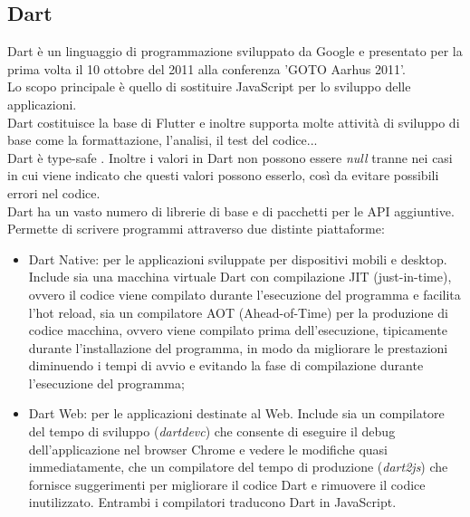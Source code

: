 \subsection{Dart}
\label{sec:Dart}
Dart \cite{dart,dartstoria} è un linguaggio di programmazione sviluppato da Google e presentato per la prima volta il 10 ottobre del 2011 alla conferenza 'GOTO Aarhus 2011'.\\
Lo scopo principale è quello di sostituire JavaScript per lo sviluppo delle applicazioni.\\
Dart costituisce la base di Flutter e inoltre supporta molte attività di sviluppo di base come la formattazione, l'analisi, il test del codice...\\
Dart è type-safe \cite{dartover}. Inoltre i valori in Dart non possono essere \textit{null} tranne nei casi in cui viene indicato che questi valori possono esserlo, così da evitare possibili errori nel codice.\\
Dart ha un vasto numero di librerie di base e di pacchetti per le API aggiuntive.\\
Permette di scrivere programmi attraverso due distinte piattaforme: 
\begin{itemize}
	\item Dart Native: per le applicazioni sviluppate per dispositivi mobili e desktop. Include sia una macchina virtuale Dart con compilazione JIT (just-in-time), ovvero il codice viene compilato durante l'esecuzione del programma e facilita l'hot reload, sia un compilatore AOT (Ahead-of-Time) per la produzione di codice macchina, ovvero  viene compilato prima dell'esecuzione, tipicamente durante l'installazione del programma, in modo da migliorare le prestazioni diminuendo i tempi di avvio e evitando la fase di compilazione durante l'esecuzione del programma;  
	\item Dart Web: per le applicazioni destinate al Web. Include sia un compilatore del tempo di sviluppo (\textit{dartdevc}) che consente di eseguire il debug dell'applicazione nel browser Chrome e vedere le modifiche quasi immediatamente, che un compilatore del tempo di produzione (\textit{dart2js}) che fornisce suggerimenti per migliorare il codice Dart e rimuovere il codice inutilizzato. Entrambi i compilatori traducono Dart in JavaScript.\\
\end{itemize}

